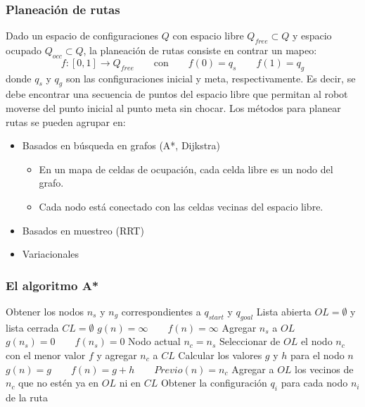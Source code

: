 \begin{frame}\frametitle{Planeación de rutas}
  Dado un espacio de configuraciones $Q$ con espacio libre $Q_{free}\subset Q$ y espacio ocupado $Q_{occ}\subset Q$, la planeación de rutas consiste en contrar un mapeo:
  \[f: [0,1] \rightarrow Q_{free} \qquad \textrm{con}\qquad f(0) = q_s\qquad f(1)=q_g\]
  donde $q_s$ y $q_g$ son las configuraciones inicial y meta, respectivamente. Es decir, se debe encontrar una secuencia de puntos del espacio libre que permitan al robot moverse del punto inicial al punto meta sin chocar. Los métodos para planear rutas se pueden agrupar en:
  \begin{itemize}
  \item Basados en búsqueda en grafos (A*, Dijkstra)
    \begin{itemize}
    \item En un mapa de celdas de ocupación, cada celda libre es un nodo del grafo.
    \item Cada nodo está conectado con las celdas vecinas del espacio libre. 
    \end{itemize}
  \item Basados en muestreo (RRT)
  \item Variacionales
  \end{itemize}
\end{frame}

\begin{frame}\frametitle{El algoritmo A*}
    \begin{algorithm}[H]
    \footnotesize
    \DontPrintSemicolon
    \;
    Obtener los nodos $n_s$ y $n_g$ correspondientes a $q_{start}$ y $q_{goal}$\;
    Lista abierta $OL = \emptyset$ y lista cerrada $CL = \emptyset$\;
    {
      $g(n) = \infty \qquad f(n) = \infty$\;
    }
    Agregar $n_s$ a $OL$\;
    $g(n_s) = 0 \qquad f(n_s) = 0$\;
    Nodo actual $n_c = n_s$\;
    {
      Seleccionar de $OL$ el nodo $n_c$ con el menor valor $f$ y agregar $n_c$ a $CL$\;
      {
        Calcular los valores $g$ y $h$ para el nodo $n$\;
        {
          $g(n) = g\qquad f(n) = g + h \qquad Previo(n) = n_c$
        }
      }
      Agregar a $OL$ los vecinos de $n_c$ que no estén ya en $OL$ ni en $CL$\;
    }
    Obtener la configuración $q_i$ para cada nodo $n_i$ de la ruta\;
  \end{algorithm}
\end{frame}

